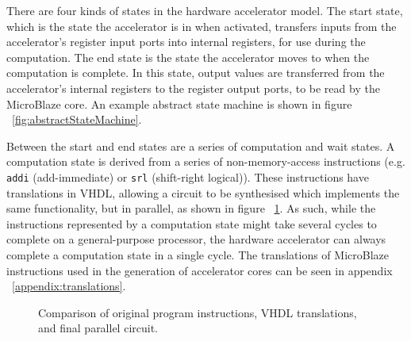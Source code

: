 \documentclass{UoYCSproject}
\begin{document}
There are four kinds of states in the hardware accelerator model. The start state, which is the state the accelerator is in
when activated, transfers inputs from the accelerator's register input ports into internal registers, for use during the
computation. The end state is the state the accelerator moves to when the computation is complete. In this state, output values
are transferred from the accelerator's internal registers to the register output ports, to be read by the MicroBlaze core.
An example abstract state machine is shown in figure ~\ref{fig:abstractStateMachine}.

Between the start and end states are a series of computation and wait states. A computation state is derived from a series of
non-memory-access instructions (e.g. \texttt{addi} (add-immediate) or \texttt{srl} (shift-right logical)).
These instructions have translations in VHDL, allowing a circuit to be synthesised which implements the same
functionality, but in parallel, as shown in figure ~\ref{fig:computationState}. As such, while the instructions represented by a
computation state might take several cycles to complete on a general-purpose processor, the hardware accelerator can always
complete a computation state in a single cycle. The translations of MicroBlaze instructions used in the generation of
accelerator cores can be seen in appendix ~\ref{appendix:translations}.

\begin{figure}[H]
\caption{Comparison of original program instructions, VHDL translations, and final parallel circuit.}
\label{fig:computationState}
\end{figure}
\end{document}
